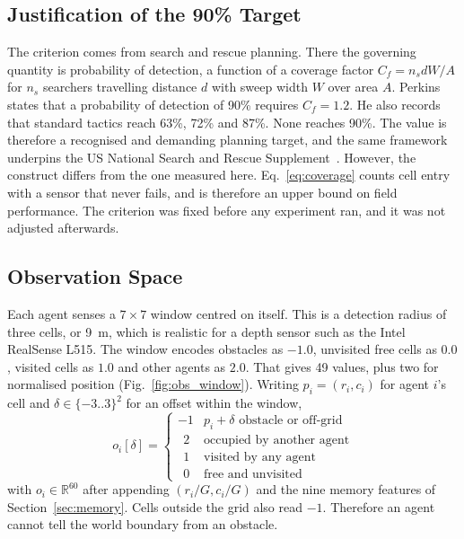\documentclass[a4paper, 10pt, conference]{ieeeconf}
\begin{document}
\subsection{Justification of the 90\% Target}\label{sec:threshold}

The criterion comes from search and rescue planning. There the
governing quantity is probability of detection, a function of a
coverage factor $C_{f} = n_{s}dW/A$ for $n_s$ searchers travelling
distance $d$ with sweep width $W$ over area $A$.
Perkins~\cite{perkins2013} states that a probability of detection of
90\% requires $C_f = 1.2$. He also records that standard tactics reach
63\%, 72\% and 87\%. None reaches 90\%. The value is therefore a
recognised and demanding planning target, and the same framework
underpins the US National Search and Rescue Supplement~\cite{nss2018}.
However, the construct differs from the one measured here.
Eq.~\ref{eq:coverage} counts cell entry with a sensor that never
fails, and is therefore an upper bound on field performance. The
criterion was fixed before any experiment ran, and it was not adjusted
afterwards.

\subsection{Observation Space}\label{sec:obs}

Each agent senses a $7\times7$ window centred on itself. This is a
detection radius of three cells, or 9~m, which is realistic for a
depth sensor such as the Intel RealSense L515. The window encodes
obstacles as $-1.0$, unvisited free cells as $0.0$, visited cells as
$1.0$ and other agents as $2.0$. That gives 49 values, plus two for
normalised position (Fig.~\ref{fig:obs_window}). Writing
$p_i=(r_i,c_i)$ for agent $i$'s cell and $\delta\in\{-3..3\}^2$ for an
offset within the window,
\begin{equation}\label{eq:obs}
o_i[\delta]=
\begin{cases}
-1 & p_i{+}\delta \text{ obstacle or off-grid}\\
\;\,2 & \text{occupied by another agent}\\
\;\,1 & \text{visited by any agent}\\
\;\,0 & \text{free and unvisited}
\end{cases}
\end{equation}
with $o_i \in \mathbb{R}^{60}$ after appending $(r_i/G, c_i/G)$ and
the nine memory features of Section~\ref{sec:memory}. Cells outside
the grid also read $-1$. Therefore an agent cannot tell the world
boundary from an obstacle.
\end{document}
